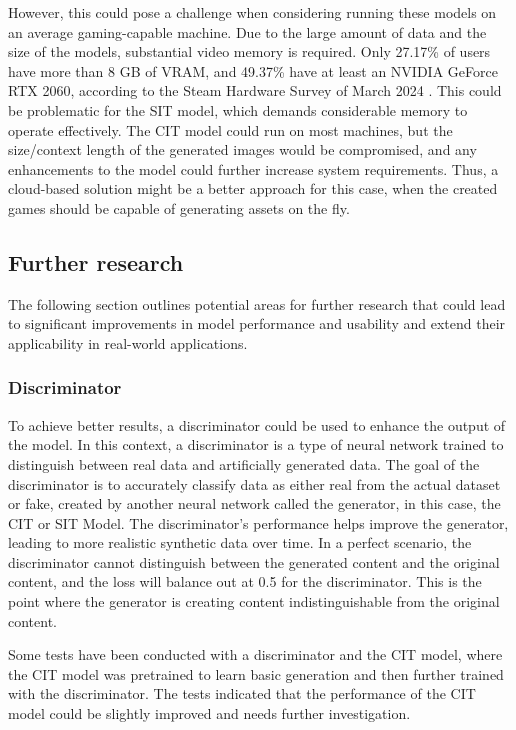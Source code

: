     However, this could pose a challenge when considering running these models on an average gaming-capable machine. Due to the large amount of data and the size of the models, substantial video memory is required. Only 27.17\% of users have more than 8 GB of VRAM, and 49.37\% have at least an NVIDIA GeForce RTX 2060, according to the Steam Hardware Survey of March 2024 \autocite{Valve2024}. This could be problematic for the SIT model, which demands considerable memory to operate effectively. The CIT model could run on most machines, but the size/context length of the generated images would be compromised, and any enhancements to the model could further increase system requirements. Thus, a cloud-based solution might be a better approach for this case, when the created games should be capable of generating assets on the fly.
    

\subsection{Further research}

    The following section outlines potential areas for further research that could lead to significant improvements in model performance and usability and extend their applicability in real-world applications.

    \subsubsection{Discriminator}
    To achieve better results, a discriminator could be used to enhance the output of the model. In this context, a discriminator is a type of neural network trained to distinguish between real data and artificially generated data. The goal of the discriminator is to accurately classify data as either real from the actual dataset or fake, created by another neural network called the generator, in this case, the CIT or SIT Model. The discriminator's performance helps improve the generator, leading to more realistic synthetic data over time. In a perfect scenario, the discriminator cannot distinguish between the generated content and the original content, and the loss will balance out at 0.5 for the discriminator. This is the point where the generator is creating content indistinguishable from the original content.

    Some tests have been conducted with a discriminator and the CIT model, where the CIT model was pretrained to learn basic generation and then further trained with the discriminator. The tests indicated that the performance of the CIT model could be slightly improved and needs further investigation.

